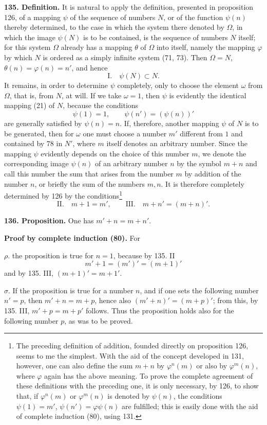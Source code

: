 \documentclass[11pt]{article}
\newcommand{\partof}{\mathrel{\subset}}
\begin{document}
\noindent\textbf{135. Definition.} It is natural to apply the definition, presented in proposition 126, of a mapping $\psi$ of the sequence of numbers $N$, or of the function $\psi(n)$ thereby determined, to the case in which the system there denoted by $\Omega$, in which the image $\psi(N)$ is to be contained, is the sequence of numbers $N$ itself; for this system $\Omega$ already has a mapping $\theta$ of $\Omega$ into itself, namely the mapping $\varphi$ by which $N$ is ordered as a simply infinite system (71, 73). Then $\Omega=N$, $\theta(n)=\varphi(n)=n'$, and hence
\[
\text{I.}\quad \psi(N)\partof N.
\]
It remains, in order to determine $\psi$ completely, only to choose the element $\omega$ from $\Omega$, that is, from $N$, at will. If we take $\omega=1$, then $\psi$ is evidently the identical mapping (21) of $N$, because the conditions
\[
\psi(1)=1,
\qquad
\psi(n')=(\psi(n))'
\]
are generally satisfied by $\psi(n)=n$. If, therefore, another mapping $\psi$ of $N$ is to be generated, then for $\omega$ one must choose a number $m'$ different from $1$ and contained by 78 in $N'$, where $m$ itself denotes an arbitrary number. Since the mapping $\psi$ evidently depends on the choice of this number $m$, we denote the corresponding image $\psi(n)$ of an arbitrary number $n$ by the symbol $m+n$ and call this number the sum that arises from the number $m$ by addition of the number $n$, or briefly the sum of the numbers $m,n$. It is therefore completely determined by 126 by the conditions\footnote{The preceding definition of addition, founded directly on proposition 126, seems to me the simplest. With the aid of the concept developed in 131, however, one can also define the sum $m+n$ by $\varphi^n(m)$ or also by $\varphi^m(n)$, where $\varphi$ again has the above meaning. To prove the complete agreement of these definitions with the preceding one, it is only necessary, by 126, to show that, if $\varphi^n(m)$ or $\varphi^m(n)$ is denoted by $\psi(n)$, the conditions $\psi(1)=m'$, $\psi(n')=\varphi\psi(n)$ are fulfilled; this is easily done with the aid of complete induction (80), using 131.}
\[
\text{II.}\quad m+1=m',
\qquad
\text{III.}\quad m+n'=(m+n)'.
\]

\noindent\textbf{136. Proposition.} One has $m'+n=m+n'$.

\noindent\textbf{Proof by complete induction (80).} For

\noindent $\rho.$ the proposition is true for $n=1$, because by 135. II
\[
m'+1=(m')'=(m+1)'
\]
and by 135. III, $(m+1)'=m+1'$.

\noindent $\sigma.$ If the proposition is true for a number $n$, and if one sets the following number $n'=p$, then $m'+n=m+p$, hence also $(m'+n)'=(m+p)'$; from this, by 135. III, $m'+p=m+p'$ follows. Thus the proposition holds also for the following number $p$, as was to be proved.
\end{document}
